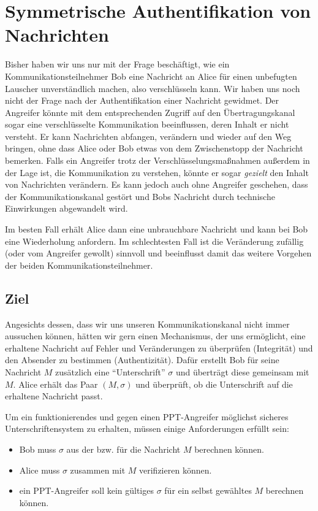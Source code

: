 \chapter{Symmetrische Authentifikation von Nachrichten}
\label{cha:symauth}

Bisher haben wir uns nur mit der Frage beschäftigt, wie ein
Kommunikationsteilnehmer Bob eine Nachricht an Alice für einen
unbefugten Lauscher unverständlich machen, also verschlüsseln kann. Wir
haben uns noch nicht der Frage nach der Authentifikation einer Nachricht
gewidmet.  Der Angreifer könnte mit dem entsprechenden Zugriff auf den
Übertragungskanal sogar eine verschlüsselte Kommunikation beeinflussen,
deren Inhalt er nicht versteht. Er kann Nachrichten abfangen, verändern
und wieder auf den Weg bringen, ohne dass Alice oder Bob etwas von dem
Zwischenstopp der Nachricht bemerken.  Falls ein Angreifer trotz der
Verschlüsselungsmaßnahmen außerdem in der Lage ist, die Kommunikation zu
verstehen, könnte er sogar \textit{gezielt} den Inhalt von Nachrichten
verändern.  Es kann jedoch auch ohne Angreifer geschehen, dass der
Kommunikationskanal gestört und Bobs Nachricht durch technische
Einwirkungen abgewandelt wird.

Im besten Fall erhält Alice dann eine unbrauchbare Nachricht und kann
bei Bob eine Wiederholung anfordern. Im schlechtesten Fall ist die
Veränderung zufällig (oder vom Angreifer gewollt) sinnvoll und
beeinflusst damit das weitere Vorgehen der beiden
Kommunikationsteilnehmer.

\section{Ziel} Angesichts dessen, dass wir uns unseren
Kommunikationskanal nicht immer aussuchen können, hätten wir gern einen
Mechanismus, der uns ermöglicht, eine erhaltene Nachricht auf Fehler und
Veränderungen zu überprüfen (Integrität) und den Absender zu bestimmen
(Authentizität). Dafür erstellt Bob für seine Nachricht $M$ zusätzlich
eine "`Unterschrift"' $\sigma$ und überträgt diese gemeinsam mit
$M$. Alice erhält das Paar $(M,\sigma)$ und überprüft, ob die
Unterschrift auf die erhaltene Nachricht passt.

Um ein funktionierendes und gegen einen PPT-Angreifer möglichst sicheres
Unterschriftensystem zu erhalten, müssen einige Anforderungen erfüllt
sein:
\begin{itemize}
\item Bob muss $\sigma$ aus der bzw. für die Nachricht $M$ berechnen
  können.
\item Alice muss $\sigma$ zusammen mit $M$ verifizieren können.
\item ein PPT-Angreifer soll kein gültiges $\sigma$ für ein selbst
  gewähltes $M$ berechnen können.
\end{itemize}

